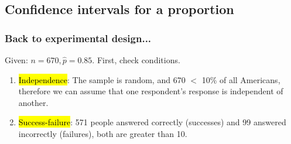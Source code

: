 \documentclass[slidestop,compress,mathserif]{beamer}
\begin{document}
%
%
%
%
%

\subsection{Confidence intervals for a proportion}


\begin{frame}
\frametitle{Back to experimental design...}


\pause
Given: $n = 670, \hat{p} = 0.85$. First, check conditions.

\pause
\begin{enumerate}[1.]
\item \hl{Independence}: The sample is random, and 670 $<$ 10\% of all Americans, therefore we can assume that one respondent's response is independent of another.
\pause
\item \hl{Success-failure}: 571 people answered correctly (successes) and 99 answered incorrectly (failures), both are greater than 10.
\end{enumerate}

\end{frame}
\end{document}
